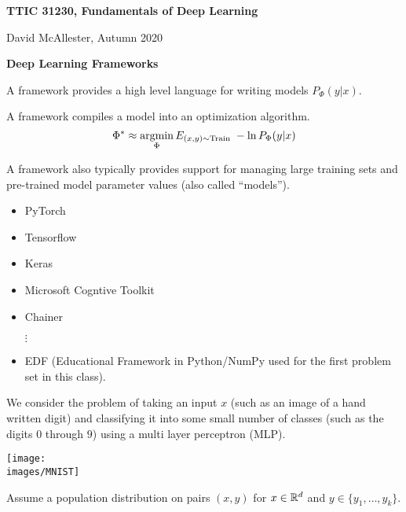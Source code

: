 




{\Huge
  
  \centerline{\bf TTIC 31230, Fundamentals of Deep Learning}
  \bigskip
  \centerline{David McAllester, Autumn 2020}
  \vfill
  \vfill
  \centerline{\bf Deep Learning Frameworks}
  \vfill
  \vfill


A framework provides a high level language for writing models $P_\Phi(y|x)$.

\vfill
A framework compiles a model into an optimization algorithm.
\vfill
{\color{red} $$\Phi^* \approx \operatorname*{argmin}_\Phi E_{(x,y) \sim \mathrm{Train}} \; -\ln P_\Phi(y|x)$$}

\vfill
A framework also typically provides support for managing large training sets and pre-trained model parameter values (also called ``models'').



\begin{itemize}

\item PyTorch

\vfill
\item Tensorflow

\vfill
\item Keras

\vfill
\item Microsoft Cogntive Toolkit

\vfill
\item Chainer

$\vdots$

\item EDF (Educational Framework in Python/NumPy used for the first problem set in this class).
\end{itemize}


We consider the problem of taking an input $x$ (such as an image of a hand written digit) and classifying it into some small number of classes (such as the digits $0$ through $9$)
using a multi layer perceptron (MLP).

\vfill
\centerline{\texttt{[image: \\images/MNIST]}}
  

Assume a population distribution on pairs $(x,y)$ for $x \in \mathbb{R}^d$ and $y \in \{y_1,\ldots, y_k\}$.

}
